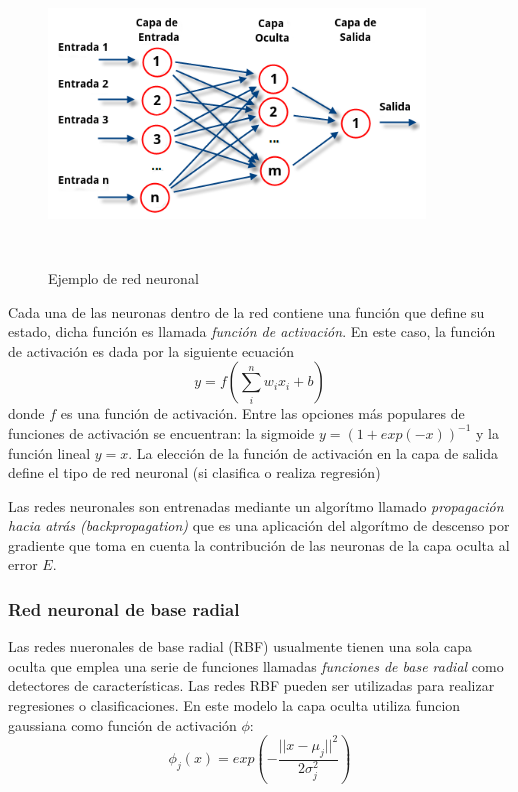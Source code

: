 {\begin{figure}
  \centering
      \includegraphics[width=10cm,height=8cm]{figures/NeuralNetwork.png} 
  \caption{Ejemplo de red neuronal}
\end{figure}

Cada una de las neuronas dentro de la red contiene una función que define su estado, dicha función es llamada \emph{función de activación}. En este caso, la función de activación es dada por la siguiente ecuación $$y=f(\sum_{i}^{n} w_ix_i+b)$$ donde $f$ es una función de activación. Entre las opciones más populares de funciones de activación se encuentran: la sigmoide $y = (1+exp(-x))^{-1}$ y la función lineal $y=x$. La elección de la función de activación en la capa de salida define el tipo de red neuronal (si clasifica o realiza regresión)

Las redes neuronales son entrenadas mediante un algorítmo llamado \emph{propagación hacia atrás (backpropagation)} que es una aplicación del algorítmo de descenso por gradiente que toma en cuenta la contribución de las neuronas de la capa oculta al error $E$.

\subsubsection*{Red neuronal de base radial}

Las redes nueronales de base radial (RBF) usualmente tienen una sola capa oculta que emplea una serie de funciones llamadas \emph{funciones de base radial} como detectores de características. Las redes RBF pueden ser utilizadas para realizar regresiones o clasificaciones. En este modelo la capa oculta utiliza funcion gaussiana como función de activación $\phi$: $$\phi_j(x)=exp(-\frac{||x-\mu_j||^2}{2\sigma_j^2})$$

}
